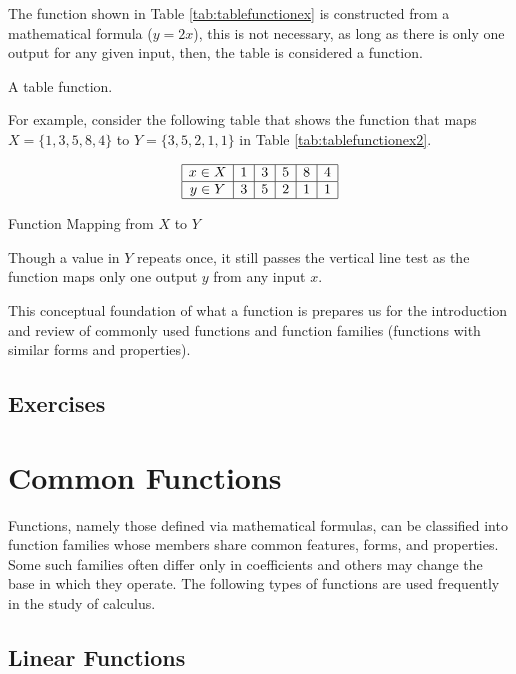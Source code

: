 The function shown in Table \ref{tab:tablefunctionex} is constructed from a mathematical formula ($y = 2x$), this is not necessary, as long as there is only one output for any given input, then, the table is considered a function.

\begin{example} A table function.

    For example, consider the following table that shows the function that maps $X = \{1,3,5,8,4\}$ to $Y = \{3,5,2,1,1\}$ in Table \ref{tab:tablefunctionex2}.
    \begin{table}[!ht]
        \centering
        \[
            \begin{array}{|*{6}{c|}}
                \hline
                x \in X & 1 & 3 & 5 & 8 & 4 \\
                \hline
                y \in Y & 3 & 5 & 2 & 1 & 1 \\
                \hline
            \end{array}
        \]
        \caption{Function Mapping from \( X \) to \( Y \)}
        \label{tab:tablefunctionex2}
    \end{table}
    Though a value in $Y$ repeats once, it still passes the vertical line test as the function maps only one output $y$ from any input $x$.
\end{example}

This conceptual foundation of what a  function is prepares us for the introduction and review of commonly used functions and function families (functions with similar forms and properties).

\subsection*{Exercises}

\section{Common Functions}\label{sect:common functions}

Functions, namely those defined via mathematical formulas, can be classified into function families whose members share common features, forms, and properties. Some such families often differ only in coefficients and others may change the base in which they operate. The following types of functions are used frequently in the study of calculus.

\subsection{Linear Functions}\label{sect:linear functions}

